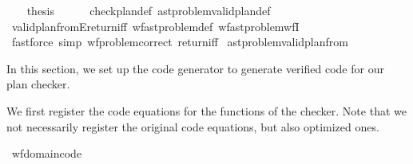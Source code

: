\begin{isabellebody}
\isanewline
\ \ \isamarkupfalse%
\ {\isacharquery}{\kern0pt}thesis\isanewline
\ \ \ \ \isamarkupfalse%
\ check{\isacharunderscore}{\kern0pt}plan{\isacharunderscore}{\kern0pt}def\ ast{\isacharunderscore}{\kern0pt}problem{\isachardot}{\kern0pt}valid{\isacharunderscore}{\kern0pt}plan{}{\isacharunderscore}{\kern0pt}def\isanewline
\ \ \ \ \isamarkupfalse%
\ valid{\isacharunderscore}{\kern0pt}plan{\isacharunderscore}{\kern0pt}from{}E{\isacharunderscore}{\kern0pt}return{\isacharunderscore}{\kern0pt}iff{\isacharprime}{\kern0pt}\ wf{\isacharunderscore}{\kern0pt}ast{\isacharunderscore}{\kern0pt}problem{\isacharunderscore}{\kern0pt}def\ wf{\isacharunderscore}{\kern0pt}ast{\isacharunderscore}{\kern0pt}problem{\isachardot}{\kern0pt}wf{\isacharunderscore}{\kern0pt}I\isanewline
\ \ \ \ \isamarkupfalse%
\ {\isacharparenleft}{\kern0pt}fastforce\ simp{\isacharcolon}{\kern0pt}\ wf{\isacharunderscore}{\kern0pt}problem{\isacharprime}{\kern0pt}{\isacharunderscore}{\kern0pt}correct\ return{\isacharunderscore}{\kern0pt}iff{\isacharparenright}{\kern0pt}\isanewline
{}\isamarkupfalse%
%
\endisatagproof
{\isafoldproof}%
%
\isadelimproof
\isanewline
%
\endisadelimproof
\isanewline
{}\isamarkupfalse%
\ ast{\isacharunderscore}{\kern0pt}problem{\isachardot}{\kern0pt}valid{\isacharunderscore}{\kern0pt}plan{\isacharunderscore}{\kern0pt}from{}%
\isadelimdocument
%
\endisadelimdocument
%
\isatagdocument
%
\isamarkuptrue%
%
\endisatagdocument
{\isafolddocument}%
%
\isadelimdocument
%
\endisadelimdocument
%
\begin{isamarkuptext}%
In this section, we set up the code generator to generate verified
  code for our plan checker.%
\end{isamarkuptext}\isamarkuptrue%
%
\isadelimdocument
%
\endisadelimdocument
%
\isatagdocument
%
\isamarkuptrue%
%
\endisatagdocument
{\isafolddocument}%
%
\isadelimdocument
%
\endisadelimdocument
%
\begin{isamarkuptext}%
We first register the code equations for the functions of the checker.
  Note that we not necessarily register the original code equations, but also
  optimized ones.%
\end{isamarkuptext}\isamarkuptrue%
\isamarkupfalse%
\ wf{\isacharunderscore}{\kern0pt}domain{\isacharunderscore}{\kern0pt}code\ {\isacharequal}{\kern0pt}\isanewline

\end{isabellebody}
